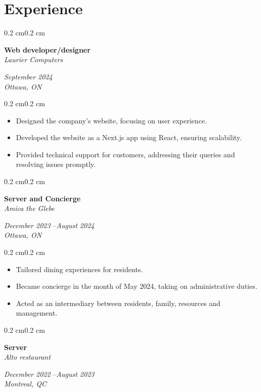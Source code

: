 \documentclass[10pt, letterpaper]{article}
\newenvironment{highlights}{%
    \begin{itemize}[
        topsep=0.10 cm,%
        parsep=0.10 cm,%
        partopsep=0pt,%
        itemsep=0pt,%
        leftmargin=0.4 cm + 10pt%
    ]
}{%
    \end{itemize}%
}
\newenvironment{onecolentry}{%
    \begin{adjustwidth}{0.2 cm}{0.2 cm}%
}{%
    \end{adjustwidth}%
}
\newenvironment{twocolentry}[1]{%
    \begin{onecolentry}%
    \def\twocolentryarg{#1}%
    \noindent
    \begin{minipage}[t]{0.68\textwidth} %
}{%
    \end{minipage}\hfill%
    \begin{minipage}[t]{0.30\textwidth} %
      \raggedleft\twocolentryarg
    \end{minipage}%
    \vspace{0.2cm}%
    \end{onecolentry}%
}
\begin{document}
\section{Experience}
\begin{twocolentry}{%
\textit{September 2024 }\textit{} \\[0.1cm]
\textit{Ottawa, ON}%
}
    \textbf{Web developer/designer }\\
    \textit{Laurier Computers }
\end{twocolentry}
\vspace{0.10 cm}
\begin{onecolentry}
    \begin{highlights}
        \item Designed the company’s website, focusing on user experience.
        \item Developed the website as a Next.js app using React, ensuring scalability.
        \item Provided technical support for customers, addressing their queries and resolving issues promptly.
    \end{highlights}
\end{onecolentry}
\vspace{0.2 cm}
\begin{twocolentry}{%
\textit{December 2023 }--\textit{August 2024} \\[0.1cm]
\textit{Ottawa, ON}%
}
    \textbf{Server and Concierge }\\
    \textit{Amica the Glebe }
\end{twocolentry}
\vspace{0.10 cm}
\begin{onecolentry}
    \begin{highlights}
        \item Tailored dining experiences for residents.
        \item Became concierge in the month of May 2024, taking on administrative duties.
        \item Acted as an intermediary between residents, family, resources and management.
    \end{highlights}
\end{onecolentry}
\vspace{0.2 cm}
\begin{twocolentry}{%
\textit{December 2022 }--\textit{August 2023} \\[0.1cm]
\textit{Montreal, QC}%
}
    \textbf{Server }\\
    \textit{Alto restaurant }
\end{twocolentry}
\end{document}
